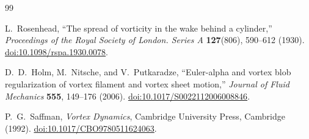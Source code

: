 \begin{thebibliography}{99}

L.~Rosenhead,
``The spread of vorticity in the wake behind a cylinder,''
\emph{Proceedings of the Royal Society of London. Series A} \textbf{127}(806), 590--612 (1930).
\href{https://doi.org/10.1098/rspa.1930.0078}{doi:10.1098/rspa.1930.0078}.

D.~D.~Holm, M.~Nitsche, and V.~Putkaradze,
``Euler-alpha and vortex blob regularization of vortex filament and vortex sheet motion,''
\emph{Journal of Fluid Mechanics} \textbf{555}, 149--176 (2006).
\href{https://doi.org/10.1017/S0022112006008846}{doi:10.1017/S0022112006008846}.

P.~G.~Saffman,
\emph{Vortex Dynamics},
Cambridge University Press, Cambridge (1992).
\href{https://doi.org/10.1017/CBO9780511624063}{doi:10.1017/CBO9780511624063}.

\end{thebibliography}
